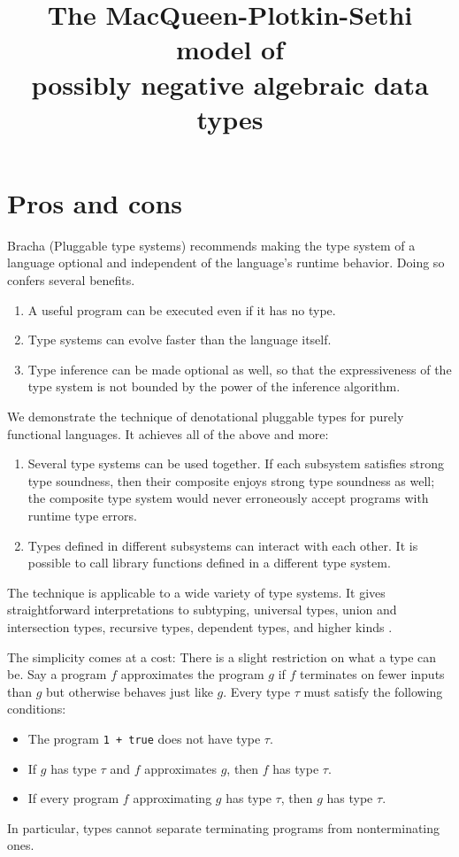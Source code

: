 \documentclass{amsart}
\title[The MPS model of possibly negative algebraic data types]
{The MacQueen-Plotkin-Sethi model of
\\
possibly negative algebraic data types}
\begin{document}
\maketitle

\def\thingsExpressibleInMpsModel{%
subtyping, universal types, union and intersection types,
recursive types, dependent types, and higher kinds%
}

\section{Pros and cons}

Bracha (Pluggable type systems) recommends making the type system
of a language optional and independent of the language's runtime
behavior. Doing so confers several benefits.
\begin{enumerate}
\item A useful program can be executed even if it has no type.
\item Type systems can evolve faster than the language itself.
\item Type inference can be made optional as well, so that the
expressiveness of the type system is not bounded by the power of
the inference algorithm.
\end{enumerate}
We demonstrate the technique of denotational pluggable types for
purely functional languages. It achieves all of the above and
more:
\begin{enumerate}\setcounter{enumi}3
\item Several type systems can be used together. If each
subsystem satisfies strong type soundness, then their composite
enjoys strong type soundness as well; the composite type system
would never erroneously accept programs with runtime type errors.
\item Types defined in different subsystems can interact with
each other. It is possible to call library functions defined
in a different type system.
\end{enumerate}
The technique is applicable to a wide variety of type systems. It
gives straightforward interpretations to \thingsExpressibleInMpsModel.

The simplicity comes at a cost: There is a slight restriction on
what a type can be. Say a program $f$ approximates the program
$g$ if $f$ terminates on fewer inputs than $g$ but otherwise
behaves just like $g$. Every type $\tau$ must satisfy the
following conditions:
\begin{itemize}
\item The program \texttt{1 + true} does not have type $\tau$.
\item If $g$ has type $\tau$ and $f$ approximates $g$, then $f$
has type $\tau$.
\item If every program $f$ approximating $g$ has type $\tau$,
then $g$ has type $\tau$.
\end{itemize}
In particular, types cannot separate terminating programs from
nonterminating ones.
\end{document}
